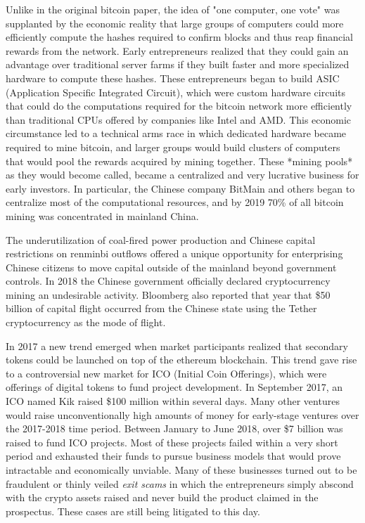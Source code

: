 Unlike in the original bitcoin paper, the idea of "one computer, one vote" was
supplanted by the economic reality that large groups of computers could more
efficiently compute the hashes required to confirm blocks and thus reap
financial rewards from the network. Early entrepreneurs realized that they could
gain an advantage over traditional server farms if they built faster and more
specialized hardware to compute these hashes. These entrepreneurs began to build
ASIC (Application Specific Integrated Circuit), which were custom hardware
circuits that could do the computations required for the bitcoin network more
efficiently than traditional CPUs offered by companies like Intel and AMD. This
economic circumstance led to a technical arms race in which dedicated hardware
became required to mine bitcoin, and larger groups would build clusters of
computers that would pool the rewards acquired by mining together. These *mining
pools* as they would become called, became a centralized and very lucrative
business for early investors. In particular, the Chinese company BitMain and
others began to centralize most of the computational resources, and by 2019 70\%
of all bitcoin mining was concentrated in mainland China.


The underutilization of coal-fired power production and Chinese capital
restrictions on renminbi outflows offered a unique opportunity for enterprising
Chinese citizens to move capital outside of the mainland beyond government
controls. In 2018 the Chinese government officially declared cryptocurrency
mining an undesirable activity. Bloomberg also reported that year that \$50
billion of capital flight occurred from the Chinese state using the Tether
cryptocurrency as the mode of flight. \cite{leising_crypto_2020}


In 2017 a new trend emerged when market participants realized that secondary
tokens could be launched on top of the ethereum blockchain. This trend gave rise
to a controversial new market for ICO (Initial Coin Offerings), which were
offerings of digital tokens to fund project development. In September 2017, an
ICO named Kik raised \$100 million within several days. Many other ventures
would raise unconventionally high amounts of money for early-stage ventures over
the 2017-2018 time period. Between January to June 2018, over \$7 billion was
raised to fund ICO projects. Most of these projects failed within a very short
period and exhausted their funds to pursue business models that would prove
intractable and economically unviable. Many of these businesses turned out to be
fraudulent or thinly veiled \textit{exit scams} in which the entrepreneurs simply
abscond with the crypto assets raised and never build the product claimed in the
prospectus. These cases are still being litigated to this day.

